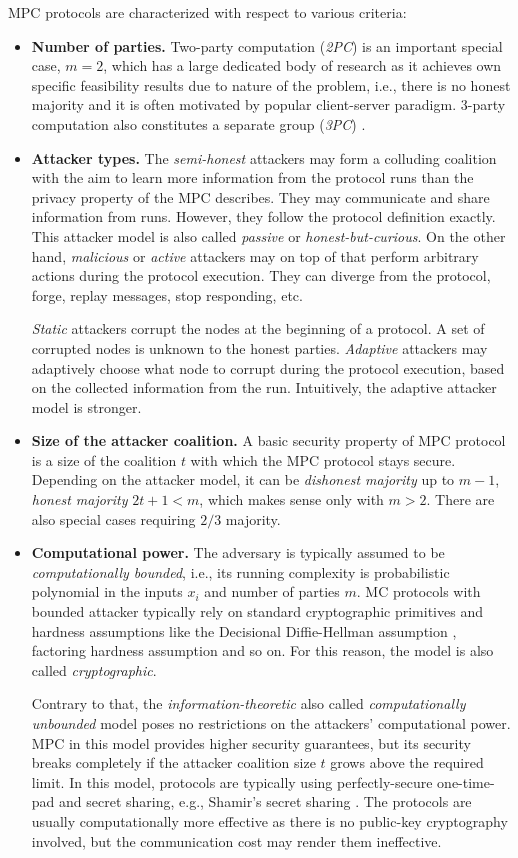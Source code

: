 \documentclass[
  digital, %
  twoside, %
  table,   %
  lof,     %
  lot,     %
]{fithesis3}
\newcommand{\itembf}[1]{\item {\bf{#1}}}
\newcounter{ph4_show_guides}
\theoremstyle{definition}
\theoremstyle{remark}
\begin{document}
MPC protocols are characterized with respect to various criteria:
\begin{itemize}
    \itembf{Number of parties.} Two-party computation (\emph{2PC}) is an important special case, $m=2$, which has a large dedicated body of research as it achieves own specific feasibility results due to nature of the problem, i.e., there is no honest majority and it is often motivated by popular client-server paradigm. 3-party computation also constitutes a separate group (\emph{3PC}) \cite{CKMZ14, MRZ15}.

    \itembf{Attacker types.} The \emph{semi-honest} attackers may form a colluding coalition with the aim to learn more information from the protocol runs than the privacy property of the MPC describes. They may communicate and share information from runs. However, they follow the protocol definition exactly. This attacker model is also called \emph{passive} or \emph{honest-but-curious}. 
    On the other hand, \emph{malicious} or \emph{active} attackers may on top of that perform arbitrary actions during the protocol execution. They can diverge from the protocol, forge, replay messages, stop responding, etc.

    \emph{Static} attackers corrupt the nodes at the beginning of a protocol. A set of corrupted nodes is unknown to the honest parties. \emph{Adaptive} attackers may adaptively choose what node to corrupt during the protocol execution, based on the collected information from the run. Intuitively, the adaptive attacker model is stronger.
    
    \itembf{Size of the attacker coalition.} A basic security property of MPC protocol is a size of the coalition $t$ with which the MPC protocol stays secure. Depending on the attacker model, it can be \emph{dishonest majority} up to $m-1$, \emph{honest majority} $2t+1 < m$, which makes sense only with $m>2$. There are also special cases requiring $2/3$ majority.

    \itembf{Computational power.} The adversary is typically assumed to be \emph{computationally bounded}, i.e., its running complexity is probabilistic polynomial in the inputs $x_i$ and number of parties $m$.
    MC protocols with bounded attacker typically rely on standard cryptographic primitives and hardness assumptions like the Decisional Diffie-Hellman assumption \cite{KL07}, factoring hardness assumption and so on. For this reason, the model is also called \emph{cryptographic}.
    
    Contrary to that, the \emph{information-theoretic} also called \emph{computationally unbounded} model poses no restrictions on the attackers' computational power. MPC in this model provides higher security guarantees, but its security breaks completely if the attacker coalition size $t$ grows above the required limit. 
    In this model, protocols are typically using perfectly-secure one-time-pad and secret sharing, e.g., Shamir's secret sharing \cite{Shamir79}. The protocols are usually computationally more effective as there is no public-key cryptography involved, but the communication cost may render them ineffective. 
    

\end{itemize}
\end{document}
